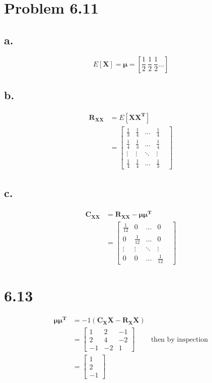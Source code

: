 \documentclass[12pt]{article}
\begin{document}
\section{Problem 6.11}
\subsection{a.}
\[
  E[\bm{X}] = \bm{\mu} =  \left[\frac{1}{2} \ \frac{1}{2} \ \frac{1}{2} \dots \right]
\]
\subsection{b.}
\begin{align*}
  \bm{R_{XX}} &= E[\bm{XX^T}] \\
  &= \begin{bmatrix}
    \frac{1}{3} & \frac{1}{4} & \dots  & \frac{1}{4} \\
    \frac{1}{4} & \frac{1}{3} & \dots  & \frac{1}{4} \\
    \vdots & \vdots & \ddots & \vdots & \\
    \frac{1}{4} & \frac{1}{4} & \dots  & \frac{1}{3}
  \end{bmatrix}
\end{align*}

\subsection{c.}
\begin{align*}
  \bm{C_{XX}} &= \bm{R_{XX} - \bm{\mu\mu^T}} \\
  &= \begin{bmatrix}
    \frac{1}{12} & 0 & \dots  & 0 \\
    0 & \frac{1}{12} & \dots  & 0 \\
    \vdots & \vdots & \ddots & \vdots & \\
    0 & 0 & \dots  & \frac{1}{12}
  \end{bmatrix}
\end{align*}

\section{6.13}
\begin{align*}
  \bm{\mu\mu^T} &= -1\left( \bm{C_XX - R_XX} \right) \\
  &= \begin{bmatrix}
    1 & 2 & -1 \\
    2 & 4 & -2 \\
   -1 & -2 & 1 
 \end{bmatrix} & \textrm{then by inspection} \\
 &= \begin{bmatrix}
   1 \\
   2 \\
   -1
 \end{bmatrix}
\end{align*}
\end{document}
